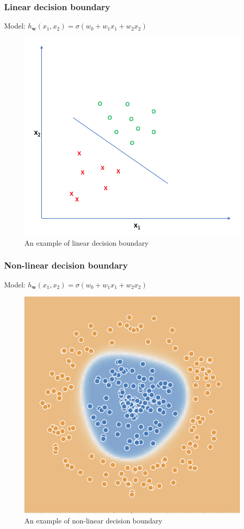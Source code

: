 \documentclass{beamer}
\begin{document}
	\begin{frame}
		\frametitle{Linear decision boundary}
		Model: $h_{\bm{w}}(x_1, x_2) = \sigma(w_0 + w_1 x_1 + w_2 x_2)$
		\begin{figure}
			\centering
			\includegraphics[scale=0.5]{images/decision_boundary}
			\caption{An example of linear decision boundary}
		\end{figure}
	\end{frame}

	\begin{frame}
		\frametitle{Non-linear decision boundary}
		Model: $h_{\bm{w}}(x_1, x_2) = \sigma(w_0 + w_1 x_1 + w_2 x_2)$
		\begin{figure}
			\centering
			\includegraphics[scale=0.8]{images/non-linear-decision-boundary}
			\caption{An example of non-linear decision boundary}
		\end{figure}
	\end{frame}
\end{document}
